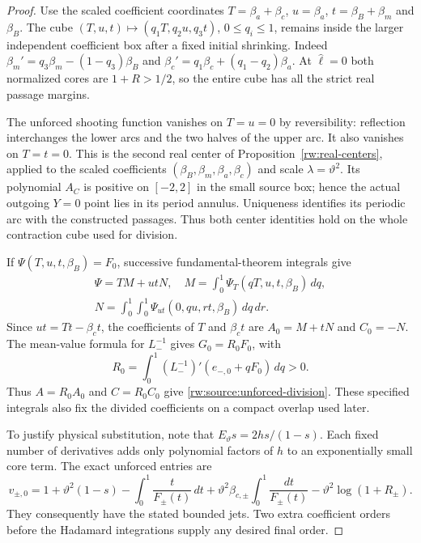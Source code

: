 \begin{proof}
Use the scaled coefficient coordinates
$T=\beta_a+\beta_c$, $u=\beta_a$, $t=\beta_B+\beta_m$ and
$\beta_B$. The cube
$(T,u,t)\mapsto(q_1T,q_2u,q_3t)$, $0\le q_i\le1$, remains
inside the larger independent coefficient box after a fixed initial
shrinking. Indeed
$\beta_m'=q_3\beta_m-(1-q_3)\beta_B$ and
$\beta_c'=q_1\beta_c+(q_1-q_2)\beta_a$.
At $\widehat\ell=0$ both normalized cores are $1+R>1/2$, so the entire
cube has all the strict real passage margins.

The unforced shooting function vanishes on $T=u=0$ by reversibility:
reflection interchanges the lower arcs and the two halves of the
upper arc. It also vanishes on $T=t=0$. This is the second real
center of Proposition~\ref{rw:real-centers}, applied to the scaled
coefficients $(\beta_B,\beta_m,\beta_a,\beta_c)$ and scale
$\lambda=\vartheta^2$. Its polynomial $A_C$ is positive on
$[-2,2]$ in the small source box; hence the actual outgoing $Y=0$
point lies in its period annulus. Uniqueness identifies its periodic
arc with the constructed passages. Thus both center identities hold
on the whole contraction cube used for division.

If $\Psi(T,u,t,\beta_B)=F_0$, successive fundamental-theorem
integrals give
\begin{equation}\label{rw:source:Hadamard-rule}
\begin{gathered}
 \Psi=TM+utN,\quad
 M=\int_0^1\Psi_T(qT,u,t,\beta_B)\,dq,\\
 N=\int_0^1\!\int_0^1\Psi_{ut}(0,qu,rt,\beta_B)\,dq\,dr.
\end{gathered}
\end{equation}
Since $ut=Tt-\beta_ct$, the coefficients of
$T$ and $\beta_ct$ are $A_0=M+tN$ and $C_0=-N$.
The mean-value formula for $L_-^{-1}$ gives
$G_0=R_0F_0$, with
\[
 R_0=\int_0^1(L_-^{-1})'(e_{-,0}+qF_0)\,dq>0.
\]
Thus $A=R_0A_0$ and $C=R_0C_0$ give
\eqref{rw:source:unforced-division}. These specified integrals also
fix the divided coefficients on a compact overlap used later.

To justify physical substitution, note that
$E_\vartheta s=2hs/(1-s)$. Each fixed number of derivatives adds
only polynomial factors of $h$ to an exponentially small core term.
The exact unforced entries are
\[
 v_{\pm,0}=1+\vartheta^2(1-s)
 -\int_0^1\frac{t}{F_\pm(t)}\,dt
 +\vartheta^2\beta_{c,\pm}\int_0^1\frac{dt}{F_\pm(t)}
 -\vartheta^2\log(1+R_\pm).
\]
They consequently have the stated bounded jets. Two extra coefficient
orders before the Hadamard integrations supply any desired final order.


\end{proof}
